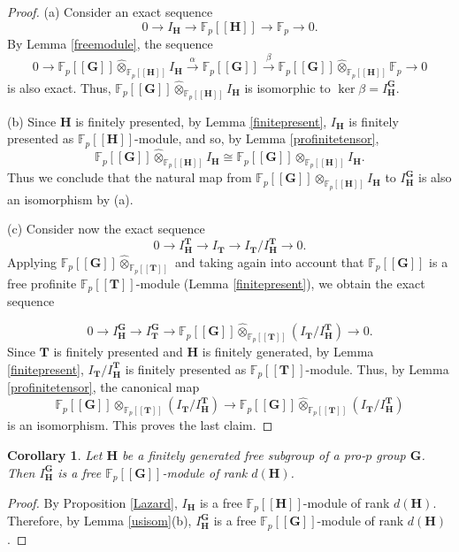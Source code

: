 \documentclass[11pt]{amsart}
\newtheorem{cor}[lem]{Corollary}
\numberwithin{claimcounter}{lem}
\newcommand{\F}{\mathbb{F}}
\begin{document}
\begin{proof}
(a) Consider an exact sequence
$$0\to I_\mathbf H\to\F_p[[\mathbf H]]\to\F_p \to 0.$$
By Lemma  \ref{freemodule}, the sequence 
$$0\to\F_p[[\mathbf G]]\widehat \otimes_{\F_p[[\mathbf H]]} I_\mathbf H\xrightarrow{\alpha}\F_p[[\mathbf G]]\xrightarrow{\beta}\F_p[[\mathbf G]]\widehat \otimes_{\F_p[[\mathbf H]]}\F_p\to 0$$
 is also exact.  
Thus,  $\F_p[[\mathbf G]]\widehat \otimes_{\F_p[[\mathbf H]]} I_\mathbf H$ is isomorphic to $\ker \beta=I_\mathbf H^\mathbf G$. 

(b) Since $\mathbf H$ is finitely presented, by Lemma \ref{finitepresent}, $I_\mathbf H$ is finitely presented as $\F_p[[\mathbf H]]$-module, and so, by Lemma \ref{profinitetensor},  
$$\F_p[[\mathbf G]]\widehat \otimes_{\F_p[[\mathbf H]]} I_\mathbf H\cong \F_p[[\mathbf G]] \otimes_{\F_p[[\mathbf H]]} I_\mathbf H.$$ 
Thus we conclude that the natural map from  $\F_p[[\mathbf G]]\otimes_{\F_p[[\mathbf H]]} I_\mathbf H$ to $I_\mathbf H^\mathbf G$ is also an isomorphism by (a).

(c) Consider now the exact sequence
$$0\to I_\mathbf H^\mathbf T\to I_\mathbf T\to I_\mathbf T/I_\mathbf H^\mathbf T\to 0.$$ Applying $\F_p[[\mathbf G]]\widehat \otimes_{\F_p[[\mathbf T]]}$ and taking   again into account that $\F_p[[\mathbf G]]$ is a free profinite $\F_p[[\mathbf T]]$-module (Lemma \ref{finitepresent}), we obtain the exact sequence

$$0\to I_\mathbf H^\mathbf G\to I_\mathbf T^\mathbf G\to\F_p[[\mathbf G]]\widehat \otimes_{\F_p[[\mathbf T]]}( I_\mathbf T/I_\mathbf H^\mathbf T)\to 0.$$ 
Since $\mathbf T$ is finitely presented and $\mathbf H$ is finitely generated,  by Lemma \ref{finitepresent},  $I_\mathbf T/I_\mathbf H^\mathbf T$ is finitely presented  as $\F_p[[\mathbf T]]$-module. 
Thus,  by Lemma \ref{profinitetensor}, the canonical map $$ \F_p[[\mathbf G]]\otimes_{\F_p[[\mathbf T]]}( I_\mathbf T/ I_\mathbf H^\mathbf T)\to \F_p[[\mathbf G]]\widehat \otimes_{\F_p[[\mathbf T]]}( I_\mathbf T/I_\mathbf H^\mathbf T) $$ is an isomorphism.  This proves the last claim.
 \end{proof}
\begin{cor}\label{freemod} Let $\mathbf H$ be a finitely generated free subgroup of a pro-$p$ group $\mathbf G$. Then $I_{\mathbf H}^{\mathbf G}$ is a free $\F_p[[\mathbf G]]$-module  of rank $d(\mathbf H)$.
\end{cor}
\begin{proof}
By Proposition \ref{Lazard}, $I_{\mathbf H}$ is a free $\F_p[[\mathbf H]]$-module of rank $d(\mathbf H)$. Therefore, by Lemma \ref{usisom}(b),  $I_{\mathbf H}^{\mathbf G}$ is a free $\F_p[[\mathbf G]]$-module  of rank $d(\mathbf H)$.
\end{proof}
\end{document}
